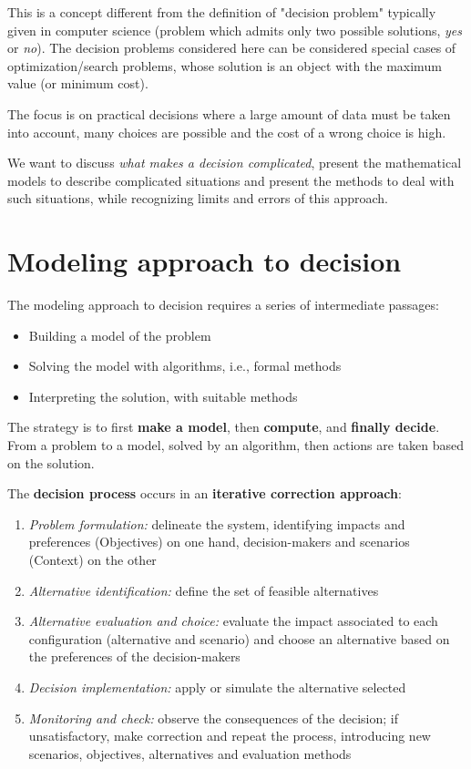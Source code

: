 This is a concept different from the definition of "decision problem" typically given in computer science (problem which admits only two possible solutions, \textit{yes} or \textit{no}). The decision problems considered here can be considered special cases of optimization/search problems, whose solution is an object with the maximum value (or minimum cost). 

The focus is on practical decisions where a large amount of data must be taken into account, many choices are possible and the cost of a wrong choice is high.

We want to discuss \textit{what makes a decision complicated}, present the mathematical models to describe complicated situations and present the methods to deal with such situations, while recognizing limits and errors of this approach.

\section{Modeling approach to decision}
\label{sec:modelingapproach}

The modeling approach to decision requires a series of intermediate passages: 
\begin{itemize}
	\item Building a model of the problem
	
	\item Solving the model with algorithms, i.e., formal methods
	
	\item Interpreting the solution, with suitable methods
\end{itemize}

The strategy is to first \textbf{make a model}, then \textbf{compute}, and \textbf{finally decide}. From a problem to a model, solved by an algorithm, then actions are taken based on the solution.

The \textbf{decision process} occurs in an \textbf{iterative correction approach}:
\begin{enumerate}
	\item \textit{Problem formulation:} delineate the system, identifying impacts and preferences (Objectives) on one hand, decision-makers and scenarios (Context) on the other
	
	\item \textit{Alternative identification:} define the set of feasible alternatives
	
	\item \textit{Alternative evaluation and choice:} evaluate the impact associated to each configuration (alternative and scenario) and choose an alternative based on the preferences of the decision-makers
	
	\item \textit{Decision implementation:} apply or simulate the alternative selected
	
	\item \textit{Monitoring and check:} observe the consequences of the decision; if unsatisfactory, make correction and repeat the process, introducing new scenarios, objectives, alternatives and evaluation methods
\end{enumerate}


